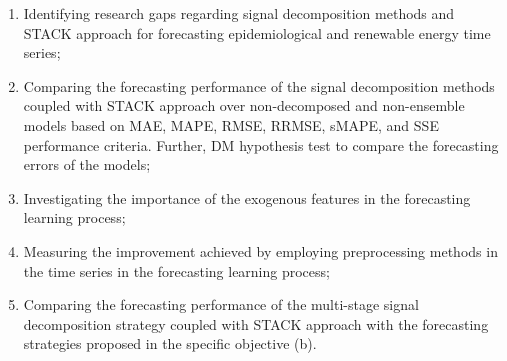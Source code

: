 \begin{enumerate}[label={\alph*)}]
    \item \label{obj_a} Identifying research gaps regarding signal decomposition methods and \ac{STACK} approach for forecasting epidemiological and renewable energy time series;

    \item \label{obj_b} Comparing the forecasting performance of the signal decomposition methods coupled with \ac{STACK} approach over non-decomposed and non-ensemble models based on \ac{MAE}, \ac{MAPE}, \ac{RMSE}, \ac{RRMSE}, \ac{sMAPE}, and \ac{SSE} performance criteria. Further, \ac{DM} hypothesis test to compare the forecasting errors of the models;

    \item \label{obj_c} Investigating the importance of the exogenous features in the forecasting learning process;

    \item \label{obj_d} Measuring the improvement achieved by employing preprocessing methods in the time series in the forecasting learning process;

    \item \label{obj_e} Comparing the forecasting performance of the multi-stage signal decomposition strategy coupled with \ac{STACK} approach with the forecasting strategies proposed in the specific objective (b).  
\end{enumerate}

